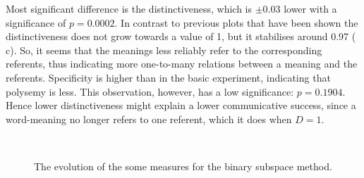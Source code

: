 \begin{description}
Most significant difference is the distinctiveness, which is $\pm 0.03$ lower with a significance of $p=0.0002$. In contrast to previous plots that have been shown the distinctiveness does not grow towards a value of 1, but it stabilises around 0.97 ( c). So, it seems that the meanings less reliably refer to the corresponding referents, thus indicating more one-to-many relations between a meaning and the referents. Specificity is higher than in the basic experiment, indicating that polysemy is less. This observation, however, has a low significance: $p=0.1904$. Hence lower distinctiveness might explain a lower communicative success, since a word-meaning no longer refers to one referent, which it does when $D=1$.
\end{description}

\begin{figure}
\centering
{}
\\
\caption{The evolution of the some measures for the binary subspace method.}
\label{f:cat:bin}
\end{figure}


